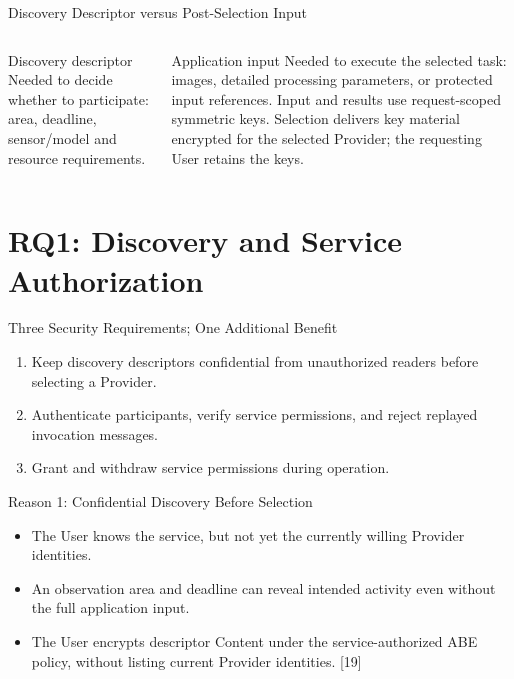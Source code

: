 \begin{frame}{Discovery Descriptor versus Post-Selection Input}
\begin{columns}[T,onlytextwidth]
\begin{block}{Discovery descriptor}
Needed to decide whether to participate: area, deadline, sensor/model and resource requirements.
\end{block}
\begin{block}{Application input}
Needed to execute the selected task: images, detailed processing parameters, or protected input references.
Input and results use request-scoped symmetric keys. Selection delivers key material encrypted for the selected Provider; the requesting User retains the keys.
\end{block}
\end{columns}
\vspace{4mm}
\end{frame}

\section{RQ1: Discovery and Service Authorization}
\begin{frame}{Three Security Requirements; One Additional Benefit}
\begin{enumerate}
\item Keep discovery descriptors confidential from unauthorized readers before selecting a Provider.
\item Authenticate participants, verify service permissions, and reject replayed invocation messages.
\item Grant and withdraw service permissions during operation.
\end{enumerate}
\vspace{3mm}
\end{frame}

\begin{frame}{Reason 1: Confidential Discovery Before Selection}
\begin{itemize}
\item The User knows the service, but not yet the currently willing Provider identities.
\item An observation area and deadline can reveal intended activity even without the full application input.
\item The User encrypts descriptor Content under the service-authorized ABE policy, without listing current Provider identities. [19]
\end{itemize}
\vspace{3mm}
\end{frame}

